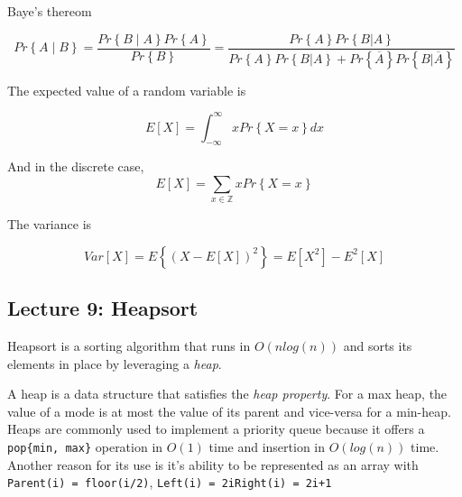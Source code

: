 \documentclass[../notes.tex]{subfiles}
\begin{document}
\begin{definition}
	Baye's thereom


	\begin{equation}
		Pr \left\{ A \mid B \right\} = \frac{Pr \left\{ B \mid A \right\} Pr \left\{ A \right\}}{Pr \left\{ B \right\}}
		= \frac{Pr \left\{ A \right\} Pr \left\{ B | A \right\} }{Pr \left\{ A \right\} Pr \left\{ B | A \right\} + Pr \left\{ \overline{A} \right\} Pr \left\{ B | \overline{A} \right\} }
	\end{equation}
	
\end{definition}


The expected value of a random variable is 

\begin{equation}
	E[X] = \int_{-\infty}^{\infty} x Pr \left\{ X = x \right\} dx
\end{equation}

And in the discrete case,
\begin{equation}
	E[X] = \sum_{x \in \mathbb{Z}} x Pr \left\{ X = x \right\}
\end{equation}


The variance is 

\begin{equation}
	Var[X] = E \left\{ \left( X - E[X] \right)^2 \right\} = E[X^2] - E^2[X]
\end{equation}





\subsection{Lecture 9: Heapsort}

Heapsort is a sorting algorithm that runs in $ O(nlog(n)) $ and sorts its elements in place by leveraging a \textit{heap}.

\begin{definition}
A heap is a data structure that satisfies the \textit{heap property}. For a max heap, the value of a mode is at most the value of its parent and vice-versa for a min-heap. Heaps are commonly used to implement a priority queue because it offers a \texttt{pop\{min, max\}} operation in $ O(1) $ time and insertion in $ O(log(n)) $ time. Another reason for its use is it's ability to be represented as an array with \texttt{Parent(i) = floor(i/2)}, \texttt{Left(i) = 2i}\texttt{Right(i) = 2i+1} 

\end{definition}
\end{document}
